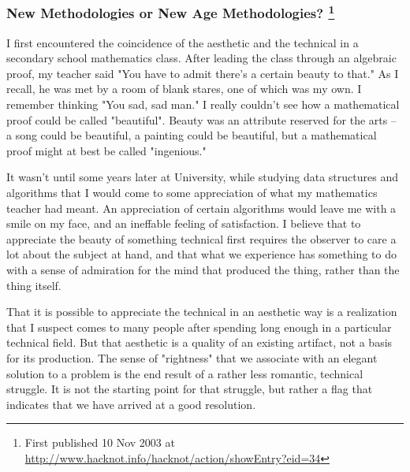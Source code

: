 \documentclass{article}
\begin{document}
\subsubsection{New Methodologies or New Age Methodologies?  \footnote{First published 10 Nov 2003 at
\url{http://www.hacknot.info/hacknot/action/showEntry?eid=34}}}
\label{sec:orgheadline204}

I first encountered the coincidence of the aesthetic and the technical
in a secondary school mathematics class. After leading the class through
an algebraic proof, my teacher said "You have to admit there's a certain
beauty to that." As I recall, he was met by a room of blank stares, one
of which was my own. I remember thinking "You sad, sad man." I really
couldn't see how a mathematical proof could be called "beautiful".
Beauty was an attribute reserved for the arts -- a song could be
beautiful, a painting could be beautiful, but a mathematical proof might
at best be called "ingenious."

It wasn't until some years later at University, while studying data
structures and algorithms that I would come to some appreciation of what
my mathematics teacher had meant. An appreciation of certain algorithms
would leave me with a smile on my face, and an ineffable feeling of
satisfaction. I believe that to appreciate the beauty of something
technical first requires the observer to care a lot about the subject at
hand, and that what we experience has something to do with a sense of
admiration for the mind that produced the thing, rather than the thing
itself.

That it is possible to appreciate the technical in an aesthetic way is a
realization that I suspect comes to many people after spending long
enough in a particular technical field. But that aesthetic is a quality
of an existing artifact, not a basis for its production. The sense of
"rightness" that we associate with an elegant solution to a problem is
the end result of a rather less romantic, technical struggle. It is not
the starting point for that struggle, but rather a flag that indicates
that we have arrived at a good resolution.
\end{document}
